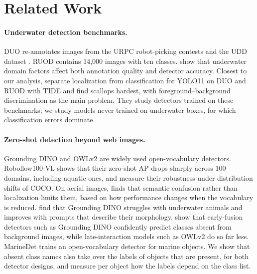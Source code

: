 \documentclass[letterpaper]{article} %
\begin{document}
\section{Related Work}

\paragraph{Underwater detection benchmarks.}
DUO \citep{liu2021duo} re-annotates images from the URPC robot-picking contests and the UDD dataset \citep{liu2022udd}. RUOD \citep{fu2023ruod} contains 14,000 images with ten classes. \citet{wille2026domain} show that underwater domain factors affect both annotation quality and detector accuracy. Closest to our analysis, \citet{wille2026marine} separate localization from classification for YOLO11 on DUO and RUOD with TIDE and find scallops hardest, with foreground--background discrimination as the main problem. They study detectors trained on these benchmarks; we study models never trained on underwater boxes, for which classification errors dominate.

\paragraph{Zero-shot detection beyond web images.}
Grounding DINO \citep{liu2024grounding} and OWLv2 \citep{minderer2023scaling} are widely used open-vocabulary detectors. Roboflow100-VL \citep{robicheaux2025rf100vl} shows that their zero-shot AP drops sharply across 100 domains, including aquatic ones, and \citet{chhipa2024robustness} measure their robustness under distribution shifts of COCO. On aerial images, \citet{tsourveloudis2026aerial} finds that semantic confusion rather than localization limits them, based on how performance changes when the vocabulary is reduced. \citet{tejeda2023zeroshot} find that Grounding DINO struggles with underwater animals and improves with prompts that describe their morphology. \citet{ruis2026tractor} show that early-fusion detectors such as Grounding DINO confidently predict classes absent from background images, while late-interaction models such as OWLv2 do so far less. MarineDet \citep{liang2023marinedet} trains an open-vocabulary detector for marine objects. We show that absent class names also take over the labels of objects that are present, for both detector designs, and measure per object how the labels depend on the class list.
\end{document}
